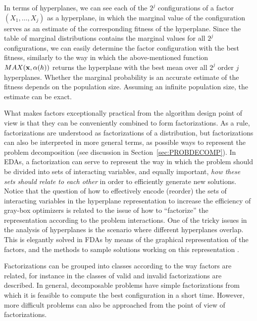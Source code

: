 \documentclass{article} %
\begin{document}
In terms of hyperplanes, we can see each of the $2^j$ configurations of a factor $(X_1,\dots,X_j)$ as a hyperplane, in which the marginal value of the configuration serves as an estimate of the corresponding fitness of the hyperplane. Since the table of marginal distributions contains the marginal values for all  $2^j$ configurations, we can easily determine the factor configuration with the best fitness, similarly to the way in which the above-mentioned function $MAX({\bf{x}},\alpha(h))$ returns the hyperplane with the best mean over all $2^j$ order $j$ hyperplanes. Whether the marginal probability is an accurate estimate of the fitness depends on the population size. Assuming an infinite population size, the estimate can be exact. 

 What makes factors exceptionally practical from the algorithm design point of view  is that they can be conveniently combined to form factorizations. As a rule, factorizations are understood as factorizations of a distribution, but factorizations can also be interpreted in more general terms, as possible ways to represent the problem decomposition (see discussion in Section~\ref{sec:PROBDECOMP}). In EDAs, a factorization can serve to represent the way in which the problem should be divided into sets of interacting variables, and equally important, \emph{how these sets should relate to each other} in order to efficiently generate new solutions. Notice that the question of how to effectively encode (reorder) the sets of interacting variables in the hyperplane representation  to increase the efficiency of gray-box optimizers  is related to the issue  of how to  ``factorize'' the representation according to the problem interactions.  One of the tricky issues in the analysis of hyperplanes is the scenario where different hyperplanes overlap. This is elegantly solved in FDAs by means of the graphical representation of the factors, and the methods to sample solutions working on this representation \cite{Muhlenbein_et_al:1999}. 

 Factorizations can be grouped into classes according to the way factors are related, for instance in \cite{Muhlenbein_et_al:1999,Santana:2005,Santana_et_al:2007f} the classes of valid and invalid factorizations are described. In general, decomposable problems have simple factorizations from which it is feasible to compute the best configuration in a short time. However,  more difficult problems can also be approached from the point of view of factorizations. 
\end{document}
